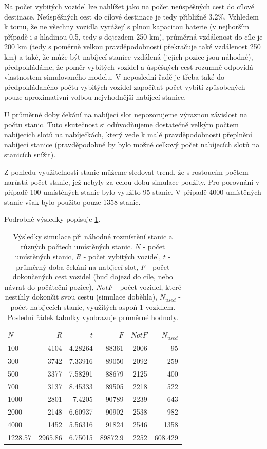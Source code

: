 Na počet vybitých vozidel lze nahlížet jako na počet neúspěšných cest do cílové destinace.
Neúspěšných cest do cílové destinace je tedy přibližně 3.2\%. Vzhledem k tomu, že ne všechny vozidla
vyrážejí s plnou kapacitou baterie (v nejhorším případě i s hladinou 0.5, tedy s dojezdem 250 km),
průměrná vzdálenost do cíle je 200 km (tedy s poměrně velkou pravděpodobností překračuje také vzdálenost 250 km)
a také, že může být nabíjecí stanice vzdálená (jejich pozice jsou náhodné), předpokládáme, 
že poměr vybitých vozidel a úspěšných cest rozumně
odpovídá vlastnostem simulovaného modelu. V neposlední řadě je třeba také do předpokládaného
počtu vybitých vozidel započítat počet vybití způsobených pouze aproximativní volbou nejvhodnější
nabíjecí stanice.

U průměrné doby čekání na nabíjecí slot nepozorujeme výraznou závislost na počtu stanic. Tuto 
skutečnost si odůvodňujeme dostatečně velkým počtem nabíjecích slotů na nabíječkách, který vede k malé
pravděpodobnosti přeplnění nabíjecí stanice (pravděpodobně by bylo možné celkový počet 
nabíjecích slotů na stanicích snížit).

Z pohledu využitelnosti stanic můžeme sledovat trend, že s rostoucím počtem narůstá počet stanic, jež
nebyly za celou dobu simulace použity. Pro porovnání v případě 100 umístěných stanic bylo využito 95 stanic.
V případě 4000 umístěných stanic však bylo použito pouze 1358 stanic.

Podrobné výsledky popisuje \cref{tab:vysledky_nahodne}.


\begin{table}
\centering\footnotesize\sf
\begin{tabular}{lrrrrr}
\toprule
$N$ & $R$ & $t$ & $F$ & $Not F$ & $N_{used}$ \\
\midrule
100 & 4104 & 4.28264 & 88361 & 2006 & 95  \\
300 & 3742 & 7.33916 & 89050 & 2092 & 259  \\
500 & 3377 & 7.58291 & 88679 & 2125 & 400  \\
700 & 3137 & 8.45333 & 89505 & 2218 & 522  \\
1000 & 2801 & 7.4205 & 90789 & 2239 & 643 \\
2000 & 2148 & 6.60937 & 90902 & 2538 & 982  \\
4000 & 1452 & 5.56316 & 91824 & 2546 & 1358 \\
\bottomrule
1228.57 & 2965.86 & 6.75015 & 89872.9 & 2252 & 608.429 \\
\end{tabular}
\caption{Výsledky simulace při náhodné rozmístění stanic a různých počtech umístěných stanic.
$N$ - počet umístěných stanic, $R$ - počet vybitých vozidel, $t$ - průměrný doba čekání na nabíjecí slot, $F$ - počet dokončených
cest vozidel (buď dojezd do cíle, nebo návrat do počáteční pozice), $Not F$ - počet vozidel, které nestihly
dokončit svou cestu (simulace doběhla), $N_{used}$ - počet nabíjecích stanic, využitých aspoň 1 vozidlem. Poslední
řádek tabulky vyobrazuje průměrné hodnoty.}
\label{tab:vysledky_nahodne}
\end{table}


